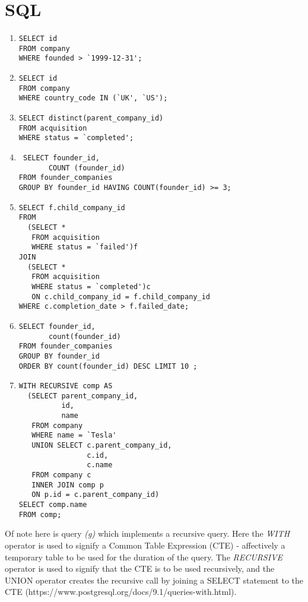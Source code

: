 \documentclass[12pt]{article}
\begin{document}
\section{SQL}
\begin{enumerate}

 \item\label{part1}\begin{verbatim}SELECT id
FROM company
WHERE founded > `1999-12-31';\end{verbatim}

  \item\label{part1}\begin{verbatim}SELECT id
FROM company
WHERE country_code IN (`UK', `US');\end{verbatim}
  \item\label{part1}\begin{verbatim}SELECT distinct(parent_company_id)
FROM acquisition
WHERE status = `completed';\end{verbatim}
  \item\label{part1}\begin{verbatim} SELECT founder_id,
       COUNT (founder_id)
FROM founder_companies
GROUP BY founder_id HAVING COUNT(founder_id) >= 3;\end{verbatim}
  \item\label{part1}\begin{verbatim}SELECT f.child_company_id
FROM
  (SELECT *
   FROM acquisition
   WHERE status = `failed')f
JOIN
  (SELECT *
   FROM acquisition
   WHERE status = `completed')c
   ON c.child_company_id = f.child_company_id
WHERE c.completion_date > f.failed_date;\end{verbatim}
  \item\label{part1}\begin{verbatim}SELECT founder_id,
       count(founder_id)
FROM founder_companies
GROUP BY founder_id
ORDER BY count(founder_id) DESC LIMIT 10 ;\end{verbatim}
  \item\label{part1}\begin{verbatim}WITH RECURSIVE comp AS
  (SELECT parent_company_id,
          id,
          name
   FROM company
   WHERE name = `Tesla'
   UNION SELECT c.parent_company_id,
                c.id,
                c.name
   FROM company c
   INNER JOIN comp p
   ON p.id = c.parent_company_id)
SELECT comp.name
FROM comp;\end{verbatim}
\end{enumerate}

Of note here is query \emph{(g)} which implements a recursive query. Here the \emph{WITH} operator is used to signify a Common Table Expression (CTE) - affectively a temporary table to be used for the duration of the query. The \emph{RECURSIVE} operator is used to signify that the CTE is to be used recursively, and the UNION operator creates the recursive call by joining a SELECT statement to the CTE (https://www.postgresql.org/docs/9.1/queries-with.html).
\end{document}
